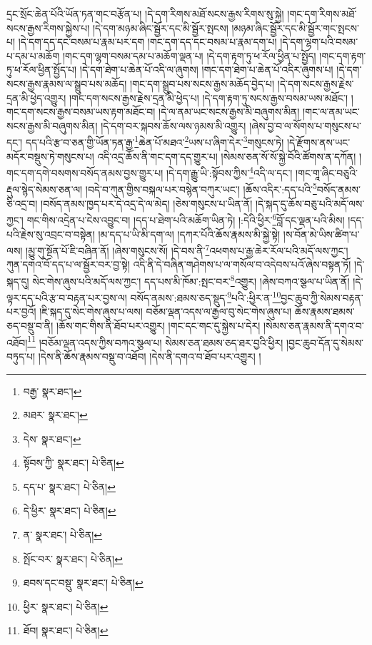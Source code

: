 དྲང་སྲོང་ཆེན་པོའི་ཡོན་ཏན་གང་བརྩོན་པ། །དེ་དག་རིགས་མཐོ་སངས་རྒྱས་རིགས་སུ་སྐྱེ། །གང་དག་རིགས་མཐོ་སངས་རྒྱས་རིགས་སྐྱེས་པ། །དེ་དག་མཉམ་ཞིང་སྦྱོར་དང་མི་སྦྱོར་སྤངས། །མཉམ་ཞིང་སྦྱོར་དང་མི་སྦྱོར་གང་སྤངས་པ། །དེ་དག་དད་དང་བསམ་པ་རྣམ་པར་དག །གང་དག་དད་དང་བསམ་པ་རྣམ་དག་པ། །དེ་དག་ལྷག་པའི་བསམ་པ་དམ་པ་མཆོག །གང་དག་ལྷག་བསམ་དམ་པ་མཆོག་ལྡན་པ། །དེ་དག་རྟག་ཏུ་ཕ་རོལ་ཕྱིན་པ་སྤྱོད། །གང་དག་རྟག་ཏུ་ཕ་རོལ་ཕྱིན་སྤྱོད་པ། །དེ་དག་ཐེག་པ་ཆེན་པོ་འདི་ལ་ཞུགས། །གང་དག་ཐེག་པ་ཆེན་པོ་འདིར་ཞུགས་པ། །དེ་དག་སངས་རྒྱས་རྣམས་ལ་སྒྲུབ་པས་མཆོད། །གང་དག་སྒྲུབ་པས་སངས་རྒྱས་མཆོད་བྱེད་པ། །དེ་དག་སངས་རྒྱས་རྗེས་དྲན་མི་ཕྱེད་འགྱུར། །གང་དག་སངས་རྒྱས་རྗེས་དྲན་མི་ཕྱེད་པ། །དེ་དག་རྟག་ཏུ་སངས་རྒྱས་བསམ་ཡས་མཐོང་། །གང་དག་སངས་རྒྱས་བསམ་ཡས་རྟག་མཐོང་བ། །དེ་ལ་ནམ་ཡང་སངས་རྒྱས་མི་བཞུགས་མིན། །གང་ལ་ནམ་ཡང་སངས་རྒྱས་མི་བཞུགས་མིན། །དེ་དག་བར་སྐབས་ཆོས་ལས་ཉམས་མི་འགྱུར། །ཞེས་བྱ་བ་ལ་སོགས་པ་གསུངས་པ་དང་། དད་པའི་རྩ་བ་ཅན་གྱི་ཡོན་ཏན་རྒྱ་\footnote{བརྒྱ་  སྣར་ཐང་། }ཆེན་པོ་མཐའ་\footnote{མཐར་  སྣར་ཐང་། }ཡས་པ་ཞིག་དེར་\footnote{དེས་  སྣར་ཐང་། }གསུངས་ཏེ། །དེ་རྫོགས་ནས་ཡང་མདོར་བསྡུས་ཏེ་གསུངས་པ། འདི་འདྲ་ཆོས་ནི་གང་དག་དད་གྱུར་པ། །སེམས་ཅན་སོ་སོ་སྐྱེ་བོའི་ཚོགས་ན་དཀོན། །གང་དག་དགེ་བསགས་བསོད་ནམས་བྱས་གྱུར་པ། །དེ་དག་རྒྱུ་ཡི་:སྟོབས་ཀྱིས་\footnote{སྟོབས་ཀྱི་  སྣར་ཐང་།  པེ་ཅིན། }འདི་ལ་དང་། །གང་གཱ་ཞིང་བཅུའི་རྡུལ་སྙེད་སེམས་ཅན་ལ། །བདེ་བ་ཀུན་གྱིས་བསྐལ་པར་བསྙེན་བཀུར་ཡང་། །ཆོས་འདིར་:དད་པའི་\footnote{དད་པ་  སྣར་ཐང་།  པེ་ཅིན། }བསོད་ནམས་ཅི་འདྲ་བ། །བསོད་ནམས་ཁྱད་པར་དེ་འདྲ་དེ་ལ་མེད། །ཅེས་གསུངས་པ་ཡིན་ནོ། །དེ་སྐད་དུ་ཆོས་བཅུ་པའི་མདོ་ལས་ཀྱང་། གང་གིས་འདྲེན་པ་ངེས་འབྱུང་བ། །དད་པ་ཐེག་པའི་མཆོག་ཡིན་ཏེ། །:དེའི་ཕྱིར་\footnote{དེ་ཕྱིར་  སྣར་ཐང་།  པེ་ཅིན། }བློ་དང་ལྡན་པའི་མིས། །དད་པའི་རྗེས་སུ་འབྲང་བ་བསྟེན། །མ་དད་པ་ཡི་མི་དག་ལ། །དཀར་པོའི་ཆོས་རྣམས་མི་སྐྱེ་སྟེ། །ས་བོན་མེ་ཡིས་ཚིག་པ་ལས། །མྱུ་གུ་སྔོན་པོ་ཇི་བཞིན་ནོ། །ཞེས་གསུངས་སོ། །དེ་བས་ནི་\footnote{ན་  སྣར་ཐང་།  པེ་ཅིན། }འཕགས་པ་རྒྱ་ཆེར་རོལ་པའི་མདོ་ལས་ཀྱང་། ཀུན་དགའ་བོ་དད་པ་ལ་སྦྱོར་བར་བྱ་སྟེ། འདི་ནི་དེ་བཞིན་གཤེགས་པ་ལ་གསོལ་བ་འདེབས་པའོ་ཞེས་བསྟན་ཏོ། །དེ་སྐད་དུ། སེང་གེས་ཞུས་པའི་མདོ་ལས་ཀྱང་། དད་པས་མི་ཁོམ་:སྤང་བར་\footnote{སྤོང་བར་  སྣར་ཐང་།  པེ་ཅིན། }འགྱུར། །ཞེས་བཀའ་སྩལ་པ་ཡིན་ནོ། །དེ་ལྟར་དད་པའི་རྩ་བ་བརྟན་པར་བྱས་ལ། བསོད་ནམས་:ཐམས་ཅད་སྡུད་\footnote{ཐབས་དང་བསྡུ་  སྣར་ཐང་།  པེ་ཅིན། }པའི་:ཕྱིར་ན་\footnote{ཕྱིར་  སྣར་ཐང་།  པེ་ཅིན། }བྱང་ཆུབ་ཀྱི་སེམས་བརྟན་པར་བྱའོ། །ཇི་སྐད་དུ་སེང་གེས་ཞུས་པ་ལས། བཅོམ་ལྡན་འདས་ལ་རྒྱལ་བུ་སེང་གེས་ཞུས་པ། ཆོས་རྣམས་ཐམས་ཅད་བསྡུ་བ་ནི། །ཆོས་གང་གིས་ནི་ཐོབ་པར་འགྱུར། །གང་དང་གང་དུ་སྐྱེས་པ་དེར། །སེམས་ཅན་རྣམས་ནི་དགའ་བ་འཐོབ།\footnote{ཐོབ།  སྣར་ཐང་།  པེ་ཅིན། } །བཅོམ་ལྡན་འདས་ཀྱིས་བཀའ་སྩལ་པ། སེམས་ཅན་ཐམས་ཅད་ཐར་བྱའི་ཕྱིར། །བྱང་ཆུབ་དོན་དུ་སེམས་བཏུད་པ། །དེས་ནི་ཆོས་རྣམས་བསྡུ་བ་འཐོབ། །དེས་ནི་དགའ་བ་ཐོབ་པར་འགྱུར། །
